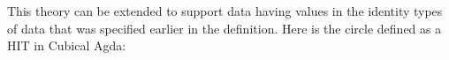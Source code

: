\documentclass[14pt]{extarticle}
\begin{document}
This theory can be extended to support data having values in the identity types of data that was specified earlier in the definition. Here is the circle defined as a HIT in Cubical Agda:
\begin{code}%
	\>[0]\AgdaSpace{}%
	\AgdaSpace{}%
	\AgdaSymbol{:}\AgdaSpace{}%
	\AgdaSpace{}%
	\<%
	\\
	\>[0][@{}l@{\AgdaIndent{0}}]%
	\>[2]\AgdaSpace{}%
	\AgdaSymbol{:}\AgdaSpace{}%
	\<%
	\\
	\>[2]\AgdaSpace{}%
	\AgdaSymbol{:}\AgdaSpace{}%
	\AgdaSpace{}%
	\AgdaOperator{\AgdaFunction{$\equiv$}}\AgdaSpace{}%
	\<%
\end{code}
\end{document}
